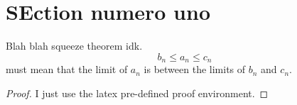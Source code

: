 \documentclass[a4paper,12pt]{article}
\begin{document}
\section{SEction numero uno}

\begin{theorem}
    Blah blah squeeze theorem idk. \[b_n \leq a_n \leq c_n\] must mean that the limit of \(a_n\) is between the limits of \(b_n\) and \(c_n\). 
\end{theorem}

\begin{proof}
    I just use the latex pre-defined proof environment. 
\end{proof}
\end{document}

